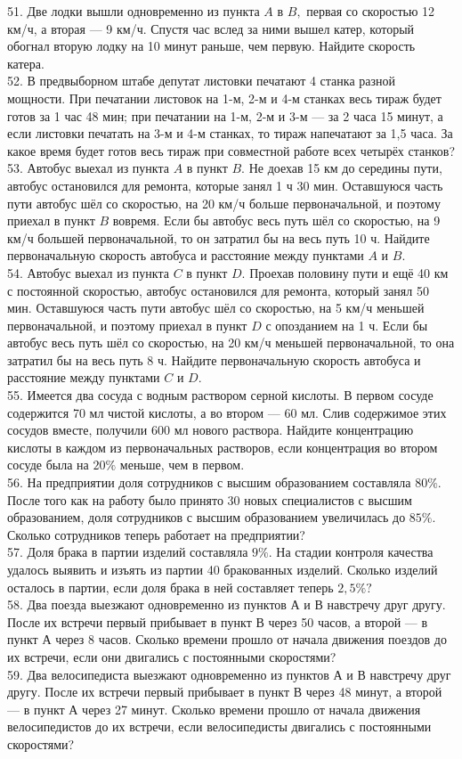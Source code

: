 51. Две лодки вышли одновременно из пункта $A$ в $B,$ первая со скоростью 12 км/ч, а вторая --- 9 км/ч. Спустя час вслед за ними вышел катер, который обогнал вторую лодку на 10 минут раньше, чем первую. Найдите скорость катера.\\
52. В предвыборном штабе депутат листовки печатают 4 станка разной мощности. При печатании листовок на 1-м, 2-м и 4-м станках весь тираж будет готов за 1 час 48 мин; при печатании на 1-м, 2-м и 3-м --- за 2 часа 15 минут, а если листовки печатать на 3-м и 4-м станках, то тираж напечатают за 1,5 часа. За какое время будет готов весь тираж при совместной работе всех четырёх станков?\\
53. Автобус выехал из пункта $A$ в пункт $B.$ Не доехав 15 км до середины пути, автобус остановился для ремонта, которые занял 1 ч 30 мин. Оставшуюся часть пути автобус шёл со скоростью, на 20 км/ч больше первоначальной, и поэтому приехал в пункт $B$ вовремя. Если бы автобус весь путь шёл со скоростью, на 9 км/ч большей первоначальной, то он затратил бы на весь путь 10 ч. Найдите первоначальную скорость автобуса и расстояние между пунктами $A$ и $B.$\\
54. Автобус выехал из пункта $C$ в пункт $D.$ Проехав половину пути и ещё 40 км с постоянной скоростью, автобус остановился для ремонта, который занял 50 мин.  Оставшуюся часть пути автобус шёл со скоростью, на 5 км/ч меньшей первоначальной, и поэтому приехал в пункт $D$ с опозданием на 1 ч. Если бы автобус весь путь шёл со скоростью, на 20 км/ч меньшей первоначальной, то она затратил бы на весь путь 8 ч. Найдите первоначальную скорость автобуса и расстояние между пунктами $C$ и $D.$\\
55. Имеется два сосуда с водным раствором серной кислоты. В первом сосуде содержится 70 мл чистой кислоты, а во втором --- 60 мл. Слив содержимое этих сосудов вместе, получили 600 мл нового раствора. Найдите концентрацию кислоты в каждом из первоначальных растворов, если концентрация во втором сосуде была на $20\%$ меньше, чем в первом.\\
56. На предприятии доля сотрудников с высшим образованием составляла $80\%.$ После того как на работу было принято 30 новых специалистов с высшим образованием, доля сотрудников с высшим образованием увеличилась до $85\%.$ Сколько сотрудников теперь работает на предприятии?\\
57. Доля брака в партии изделий составляла $9\%.$ На стадии контроля качества удалось выявить и изъять из партии 40 бракованных изделий. Сколько изделий осталось в партии, если доля брака в ней составляет теперь $2,5\%?$\\
58. Два поезда выезжают одновременно из пунктов А и В навстречу друг другу. После их встречи первый прибывает в пункт В через 50 часов, а второй --- в пункт А через 8 часов. Сколько времени прошло от начала движения поездов до их встречи, если они двигались с постоянными скоростями?\\
59. Два велосипедиста выезжают одновременно из пунктов А и В навстречу друг другу. После их встречи первый прибывает в пункт В через 48 минут, а второй --- в пункт А через 27 минут. Сколько времени прошло от начала движения велосипедистов до их встречи, если велосипедисты двигались с постоянными скоростями?
\newpage
